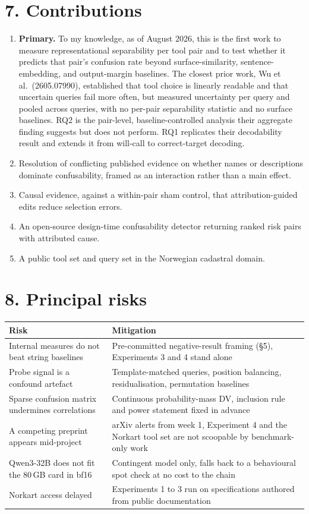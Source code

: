 \documentclass[11pt,a4paper]{article}
\begin{document}
\section*{7. Contributions}

\begin{enumerate}
    \item \textbf{Primary.} To my knowledge, as of August 2026, this is the first work to measure
    representational separability per tool pair and to test whether it predicts that pair's
    confusion rate beyond surface-similarity, sentence-embedding, and output-margin baselines.
    The closest prior work, Wu et al.\ (2605.07990), established that tool choice is linearly
    readable and that uncertain queries fail more often, but measured uncertainty per query and
    pooled across queries, with no per-pair separability statistic and no surface baselines. RQ2
    is the pair-level, baseline-controlled analysis their aggregate finding suggests but does not
    perform. RQ1 replicates their decodability result and extends it from will-call to
    correct-target decoding.
    \item Resolution of conflicting published evidence on whether names or descriptions dominate
    confusability, framed as an interaction rather than a main effect.
    \item Causal evidence, against a within-pair sham control, that attribution-guided edits reduce
    selection errors.
    \item An open-source design-time confusability detector returning ranked risk pairs with attributed
    cause.
    \item A public tool set and query set in the Norwegian cadastral domain.
\end{enumerate}

\section*{8. Principal risks}

\begin{tabular}{@{}L{5.4cm}L{10.0cm}@{}}
\toprule
\textbf{Risk} & \textbf{Mitigation} \\
\midrule
Internal measures do not beat string baselines & Pre-committed negative-result framing (\S5), Experiments 3 and 4 stand alone \\
Probe signal is a confound artefact & Template-matched queries, position balancing, residualisation, permutation baselines \\
Sparse confusion matrix undermines correlations & Continuous probability-mass DV, inclusion rule and power statement fixed in advance \\
A competing preprint appears mid-project & arXiv alerts from week 1, Experiment 4 and the Norkart tool set are not scoopable by benchmark-only work \\
Qwen3-32B does not fit the 80\,GB card in bf16 & Contingent model only, falls back to a behavioural spot check at no cost to the chain \\
Norkart access delayed & Experiments 1 to 3 run on specifications authored from public documentation \\
\bottomrule
\end{tabular}
\end{document}
